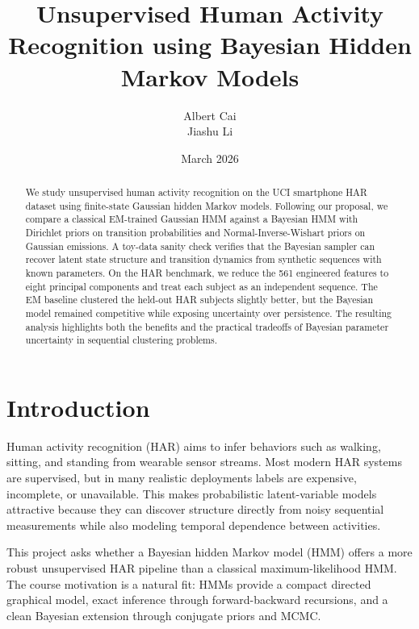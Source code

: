 \documentclass[11pt]{article}
\title{Unsupervised Human Activity Recognition using Bayesian Hidden Markov Models}
\author{Albert Cai \\ Jiashu Li}
\date{March 2026}
\begin{document}
\maketitle

\begin{abstract}
We study unsupervised human activity recognition on the UCI smartphone HAR dataset using finite-state Gaussian hidden Markov models. Following our proposal, we compare a classical EM-trained Gaussian HMM against a Bayesian HMM with Dirichlet priors on transition probabilities and Normal-Inverse-Wishart priors on Gaussian emissions. A toy-data sanity check verifies that the Bayesian sampler can recover latent state structure and transition dynamics from synthetic sequences with known parameters. On the HAR benchmark, we reduce the 561 engineered features to eight principal components and treat each subject as an independent sequence. The EM baseline clustered the held-out HAR subjects slightly better, but the Bayesian model remained competitive while exposing uncertainty over persistence. The resulting analysis highlights both the benefits and the practical tradeoffs of Bayesian parameter uncertainty in sequential clustering problems.
\end{abstract}

\section{Introduction}
Human activity recognition (HAR) aims to infer behaviors such as walking, sitting, and standing from wearable sensor streams. Most modern HAR systems are supervised, but in many realistic deployments labels are expensive, incomplete, or unavailable. This makes probabilistic latent-variable models attractive because they can discover structure directly from noisy sequential measurements while also modeling temporal dependence between activities.

This project asks whether a Bayesian hidden Markov model (HMM) offers a more robust unsupervised HAR pipeline than a classical maximum-likelihood HMM. The course motivation is a natural fit: HMMs provide a compact directed graphical model, exact inference through forward-backward recursions, and a clean Bayesian extension through conjugate priors and MCMC.
\end{document}
